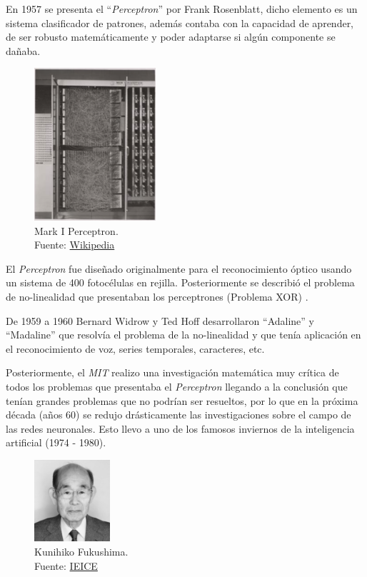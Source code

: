 En 1957 se presenta el ``\textit{Perceptron}'' por {Frank Rosenblatt}, dicho elemento es un sistema clasificador de patrones, además contaba con la capacidad de aprender, de ser robusto matemáticamente y poder adaptarse si algún componente se dañaba.

\begin{figure}[H]
    \centering
    \includegraphics[width=0.4\textwidth]{figures/perceptron.png}
    \caption{Mark I Perceptron.\\Fuente: \href{https://en.wikipedia.org/wiki/Perceptron}{Wikipedia}}
    \label{fig:perceptron}
\end{figure}

El \textit{Perceptron} fue diseñado originalmente para el reconocimiento óptico usando un sistema de 400 fotocélulas en rejilla.
Posteriormente se describió el problema de no-linealidad que presentaban los perceptrones (Problema XOR) \cite{cuevastello2018apuntes}.

De 1959 a 1960 {Bernard Widrow} y {Ted Hoff} desarrollaron ``Adaline'' y ``Madaline'' \cite{widrow1960adaptive} que resolvía el problema de la no-linealidad y que tenía aplicación en el reconocimiento de voz, series temporales, caracteres, etc.

Posteriormente, el \textit{MIT} realizo una investigación matemática muy crítica de todos los problemas que presentaba el \textit{Perceptron} llegando a la conclusión que tenían grandes problemas que no podrían ser resueltos, por lo que en la próxima década (años 60) se redujo drásticamente las investigaciones sobre el campo de las redes neuronales.
Esto llevo a uno de los famosos inviernos de la inteligencia artificial (1974 - 1980).

\begin{figure}[H]
    \centering
    \includegraphics[width=0.25\textwidth]{figures/Kunihiko Fukushima.jpg}
    \caption{Kunihiko Fukushima.\\Fuente: \href{https://www.ieice.org/eng/about_ieice/new_honorary_members_award_winners/2017/meiyo_05e.html}{IEICE}}
    \label{fig:kunihiko-fukushima}
\end{figure}

